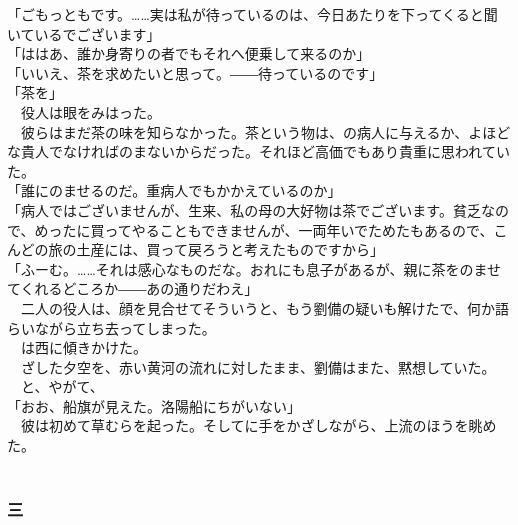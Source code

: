 \documentclass[
  paper=a5,
  fontsize=10pt,
  jafontsize=9.5pt,
  tate,                  %
  open_bracket_pos=nibu, %
]{jlreq}
\begin{document}
「ごもっともです。……実は私が待っているのは、今日あたりを下ってくると聞いているでございます」\\


「ははあ、誰か身寄りの者でもそれへ便乗して来るのか」\\


「いいえ、茶を求めたいと思って。――待っているのです」\\


「茶を」\\


　役人は眼をみはった。\\


　彼らはまだ茶の味を知らなかった。茶という物は、の病人に与えるか、よほどな貴人でなければのまないからだった。それほど高価でもあり貴重に思われていた。\\


「誰にのませるのだ。重病人でもかかえているのか」\\


「病人ではございませんが、生来、私の母の大好物は茶でございます。貧乏なので、めったに買ってやることもできませんが、一両年いでためたもあるので、こんどの旅の土産には、買って戻ろうと考えたものですから」\\


「ふーむ。……それは感心なものだな。おれにも息子があるが、親に茶をのませてくれるどころか――あの通りだわえ」\\


　二人の役人は、顔を見合せてそういうと、もう劉備の疑いも解けたで、何か語らいながら立ち去ってしまった。\\


　は西に傾きかけた。\\


　ざした夕空を、赤い黄河の流れに対したまま、劉備はまた、黙想していた。\\


　と、やがて、\\


「おお、船旗が見えた。洛陽船にちがいない」\\


　彼は初めて草むらを起った。そしてに手をかざしながら、上流のほうを眺めた。\\

\\

\subsubsection{三}
\end{document}
